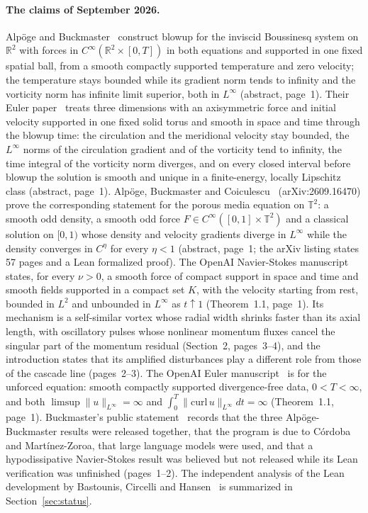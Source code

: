 \documentclass[11pt]{article}
\theoremstyle{remark}
\newcommand{\ev}[1]{\hspace{0.2em}{\small\textsf{[#1]}}}
\begin{document}
\paragraph{The claims of September 2026.} Alp\"oge and Buckmaster~\cite{ab-boussinesq} construct blowup for
the inviscid Boussinesq system on $\mathbb R^{2}$ with forces in $C^{\infty}(\mathbb R^{2}\times[0,T])$ in both
equations and supported in one fixed spatial ball, from a smooth compactly supported temperature and zero
velocity; the temperature stays bounded while its gradient norm tends to infinity and the vorticity norm has
infinite limit superior, both in $L^{\infty}$ \ev{V} (abstract, page~1). Their Euler paper~\cite{ab-euler}
treats three dimensions with an axisymmetric force and initial velocity supported in one fixed solid torus
and smooth in space and time through the blowup time: the circulation and the meridional velocity stay
bounded, the $L^{\infty}$ norms of the circulation gradient and of the vorticity tend to infinity, the time
integral of the vorticity norm diverges, and on every closed interval before blowup the solution is smooth
and unique in a finite-energy, locally Lipschitz class \ev{V} (abstract, page~1). Alp\"oge, Buckmaster and
Coiculescu~\cite{ab-ipm} (arXiv:2609.16470) prove the corresponding statement for the porous media equation
on $\mathbb T^{2}$: a smooth odd density, a smooth odd force $F\in C^{\infty}([0,1]\times\mathbb T^{2})$ and a
classical solution on $[0,1)$ whose density and velocity gradients diverge in $L^{\infty}$ while the density
converges in $C^{\eta}$ for every $\eta<1$ \ev{V} (abstract, page~1; the arXiv listing states 57 pages and a
Lean formalized proof). The OpenAI Navier-Stokes manuscript~\cite{openai-ns} states, for every $\nu>0$, a
smooth force of compact support in space and time and smooth fields supported in a compact set $K$, with the
velocity starting from rest, bounded in $L^{2}$ and unbounded in $L^{\infty}$ as $t\uparrow1$ \ev{V} (Theorem~1.1,
page~1). Its mechanism is a self-similar vortex whose radial width shrinks faster than its axial length, with
oscillatory pulses whose nonlinear momentum fluxes cancel the singular part of the momentum residual
\ev{V} (Section~2, pages~3--4), and the introduction states that its amplified disturbances play a different
role from those of the cascade line (pages~2--3). The OpenAI Euler manuscript~\cite{openai-euler} is for the
unforced equation: smooth compactly supported divergence-free data, $0<T<\infty$, and both
$\limsup\|u\|_{L^{\infty}}=\infty$ and $\int_{0}^{T}\|\mathrm{curl}\,u\|_{L^{\infty}}dt=\infty$
\ev{V} (Theorem~1.1, page~1). Buckmaster's public statement~\cite{abstat} records that the three
Alp\"oge-Buckmaster results were released together, that the program is due to C\'ordoba and
Mart\'inez-Zoroa, that large language models were used, and that a hypodissipative Navier-Stokes result was
believed but not released while its Lean verification was unfinished \ev{V} (pages~1--2). The independent
analysis of the Lean development by Bastounis, Circelli and Hansen~\cite{bch} is summarized in
Section~\ref{sec:status}.
\end{document}
